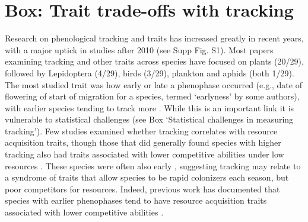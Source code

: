 \documentclass[11pt,letterpaper]{article}
\begin{document}
\section{Box: Trait trade-offs with tracking}
Research on phenological tracking and traits has increased greatly in recent years, with a major uptick in studies after 2010 (see Supp Fig. S1). Most papers examining tracking and other traits across species have focused on plants (20/29), followed by Lepidoptera (4/29), birds (3/29), plankton and aphids (both 1/29). The most studied trait was how early or late a phenophase occurred (e.g., date of flowering of start of migration for a species, termed `earlyness' by some authors), with earlier species tending to track more \citep[studies included both birds and Lepidotera,][]{Diamond:2011nx,Ishioka2013,kharouba2014,du2017}. While this is an important link it is vulnerable to statistical challenges (see Box `Statistical challenges in measuring tracking'). Few studies examined whether tracking correlates with resource acquisition traits, though those that did generally found species with higher tracking also had traits associated with lower competitive abilities under low resources \citep[e.g., being shallower or lacking a taproot rooted][]{Dorji2013,lasky2016,Zhu2016BioLetters}. These species were often also early \citep[e.g.,][]{Dorji2013,Zhu2016BioLetters}, suggesting tracking may relate to a syndrome of traits that allow species to be rapid colonizers each season, but poor competitors for resources. Indeed, previous work has documented that species with earlier phenophases tend to have resource acquisition traits associated with lower competitive abilities \citep[e.g., they tend to be of lower height, have shallower roots, narrower diameter vessels, thinner leaves, and grow faster,][]{wolkovich2014aob}. 


\end{document}
